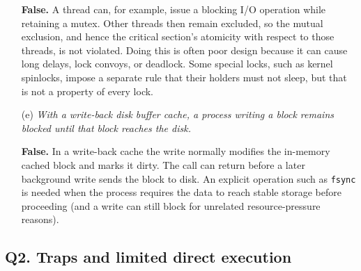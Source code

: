 \begin{enumerate}
\textbf{False.}  A thread can, for example, issue a blocking I/O operation
while retaining a mutex.  Other threads then remain excluded, so the mutual
exclusion, and hence the critical section's atomicity with respect to those
threads, is not violated.  Doing this is often poor design because it can
cause long delays, lock convoys, or deadlock.  Some special locks, such as
kernel spinlocks, impose a separate rule that their holders must not sleep,
but that is not a property of every lock.

\item[(e)] \emph{With a write-back disk buffer cache, a process writing a
block remains blocked until that block reaches the disk.}

\textbf{False.}  In a write-back cache the write normally modifies the
in-memory cached block and marks it dirty.  The call can return before a
later background write sends the block to disk.  An explicit operation such
as \texttt{fsync} is needed when the process requires the data to reach
stable storage before proceeding (and a write can still block for unrelated
resource-pressure reasons).
\end{enumerate}

\subsection*{Q2. Traps and limited direct execution}

